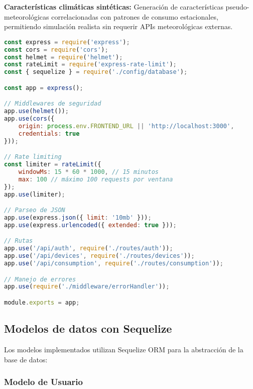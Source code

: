 \textbf{Características climáticas sintéticas:} Generación de características pseudo-meteorológicas correlacionadas con patrones de consumo estacionales, permitiendo simulación realista sin requerir APIs meteorológicas externas.

\begin{lstlisting}[language=JavaScript, caption=Configuración principal de Express]
const express = require('express');
const cors = require('cors');
const helmet = require('helmet');
const rateLimit = require('express-rate-limit');
const { sequelize } = require('./config/database');

const app = express();

// Middlewares de seguridad
app.use(helmet());
app.use(cors({
    origin: process.env.FRONTEND_URL || 'http://localhost:3000',
    credentials: true
}));

// Rate limiting
const limiter = rateLimit({
    windowMs: 15 * 60 * 1000, // 15 minutos
    max: 100 // máximo 100 requests por ventana
});
app.use(limiter);

// Parseo de JSON
app.use(express.json({ limit: '10mb' }));
app.use(express.urlencoded({ extended: true }));

// Rutas
app.use('/api/auth', require('./routes/auth'));
app.use('/api/devices', require('./routes/devices'));
app.use('/api/consumption', require('./routes/consumption'));

// Manejo de errores
app.use(require('./middleware/errorHandler'));

module.exports = app;
\end{lstlisting}

\subsection{Modelos de datos con Sequelize}

Los modelos implementados utilizan Sequelize ORM para la abstracción de la base de datos:

\subsubsection{Modelo de Usuario}


